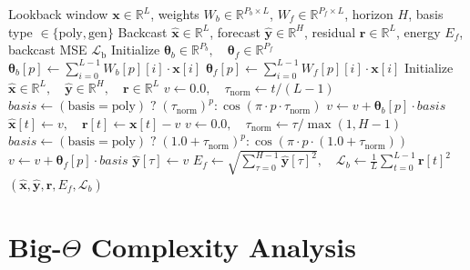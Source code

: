 \documentclass[11pt,a4paper]{article}
\theoremstyle{definition}
\begin{document}
\begin{algorithm}[H]
\caption{N-BEATS Basis Expansion Block Forward Pass}
\begin{algorithmic}[1]
\Require Lookback window $\mathbf{x} \in \mathbb{R}^L$, weights $W_b \in \mathbb{R}^{P_b \times L}$, $W_f \in \mathbb{R}^{P_f \times L}$, horizon $H$, basis type $\in \{\text{poly}, \text{gen}\}$
\Ensure Backcast $\widehat{\mathbf{x}} \in \mathbb{R}^L$, forecast $\widehat{\mathbf{y}} \in \mathbb{R}^H$, residual $\mathbf{r} \in \mathbb{R}^L$, energy $E_f$, backcast MSE $\mathcal{L}_{\text{b}}$
\State Initialize $\boldsymbol{\theta}_b \in \mathbb{R}^{P_b}, \quad \boldsymbol{\theta}_f \in \mathbb{R}^{P_f}$
 
    \State $\boldsymbol{\theta}_b[p] \gets \sum_{i=0}^{L-1} W_b[p][i] \cdot \mathbf{x}[i]$
\EndFor
{} 
    \State $\boldsymbol{\theta}_f[p] \gets \sum_{i=0}^{L-1} W_f[p][i] \cdot \mathbf{x}[i]$
\EndFor
\State Initialize $\widehat{\mathbf{x}} \in \mathbb{R}^L, \quad \widehat{\mathbf{y}} \in \mathbb{R}^H, \quad \mathbf{r} \in \mathbb{R}^L$
 
    \State $v \gets 0.0, \quad \tau_{\text{norm}} \gets t / (L - 1)$
        \State $basis \gets (\text{basis} = \text{poly}) \;?\; (\tau_{\text{norm}})^p : \cos(\pi \cdot p \cdot \tau_{\text{norm}})$
        \State $v \gets v + \boldsymbol{\theta}_b[p] \cdot basis$
    \EndFor
    \State $\widehat{\mathbf{x}}[t] \gets v, \quad \mathbf{r}[t] \gets \mathbf{x}[t] - v$
\EndFor
{} 
    \State $v \gets 0.0, \quad \tau_{\text{norm}} \gets \tau / \max(1, H - 1)$
        \State $basis \gets (\text{basis} = \text{poly}) \;?\; (1.0 + \tau_{\text{norm}})^p : \cos(\pi \cdot p \cdot (1.0 + \tau_{\text{norm}}))$
        \State $v \gets v + \boldsymbol{\theta}_f[p] \cdot basis$
    \EndFor
    \State $\widehat{\mathbf{y}}[\tau] \gets v$
\EndFor
\State $E_f \gets \sqrt{\sum_{\tau=0}^{H-1} \widehat{\mathbf{y}}[\tau]^2}, \quad \mathcal{L}_b \gets \frac{1}{L}\sum_{t=0}^{L-1} \mathbf{r}[t]^2$
\State \Return $(\widehat{\mathbf{x}}, \widehat{\mathbf{y}}, \mathbf{r}, E_f, \mathcal{L}_b)$
\end{algorithmic}
\end{algorithm}

\section{Big-$\Theta$ Complexity Analysis}
\end{document}
